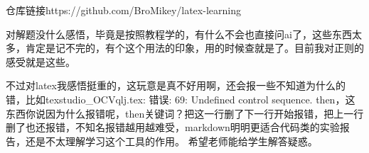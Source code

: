 \documentclass{article}
\begin{document}
	仓库链接https://github.com/BroMikey/latex-learning
	
	对解题没什么感悟，毕竟是按照教程学的，有什么不会也直接问ai了，这些东西太多，肯定是记不完的，有个这个用法的印象，用的时候查就是了。目前我对正则的感受就是这些。
	
	不过对latex我感悟挺重的，这玩意是真不好用啊，还会报一些不知道为什么的错，比如texstudio\_OCVqlj.tex: 错误: 69: Undefined control sequence. then，这东西你说因为什么报错呢，then关键词？把这一行删了下一行开始报错，把上一行删了也还报错，不知名报错越用越难受，markdown明明更适合代码类的实验报告，还是不太理解学习这个工具的作用。	希望老师能给学生解答疑惑。
	
\end{document}
